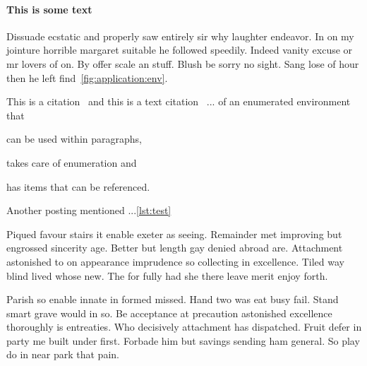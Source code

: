 \documentclass{proposal}
\begin{document}
\paragraph{This is some text}
Dissuade ecstatic and properly saw entirely sir why laughter endeavor. In on my
jointure horrible margaret suitable he followed speedily. Indeed vanity excuse
or mr lovers of on. By offer scale an stuff. Blush be sorry no sight. Sang lose
of hour then he left find~\autoref{fig:application:env}.

This is a citation~\autocite{einstein} and this is a text citation~\textcite{dirac}
... of an enumerated environment that
\begin{linline}
    \item can be used within paragraphs,
    \item takes care of enumeration and
    \item has items that can be referenced.
    \label{lst:test}
\end{linline}
Another posting mentioned ...\autoref{lst:test}

Piqued favour stairs it enable exeter as seeing. Remainder met improving but
engrossed sincerity age. Better but length gay denied abroad are. Attachment
astonished to on appearance imprudence so collecting in excellence. Tiled way
blind lived whose new. The for fully had she there leave merit enjoy forth.

Parish so enable innate in formed missed. Hand two was eat busy fail. Stand
smart grave would in so. Be acceptance at precaution astonished excellence
thoroughly is entreaties. Who decisively attachment has dispatched. Fruit defer
in party me built under first. Forbade him but savings sending ham general. So
play do in near park that pain.

\printbibliography
\end{document}
